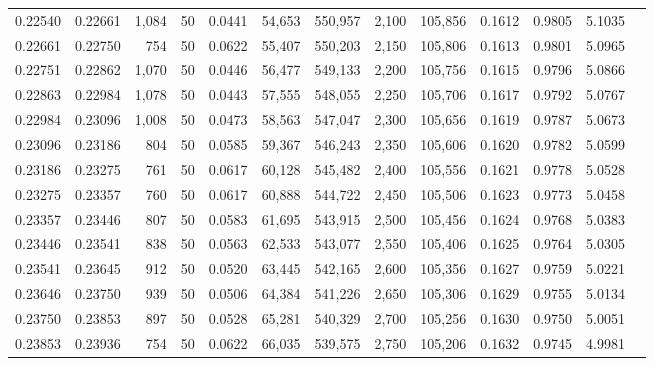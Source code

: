 \begin{tabular}{rrrrrrrrrrrrr}
0.22540 & 0.22661 & 1,084 &  50 &                                     0.0441 &  54,653 & 550,957 &   2,100 & 105,856 & 0.1612 & 0.9805 & 5.1035 \\
0.22661 & 0.22750 &   754 &  50 &                                     0.0622 &  55,407 & 550,203 &   2,150 & 105,806 & 0.1613 & 0.9801 & 5.0965 \\
0.22751 & 0.22862 & 1,070 &  50 &                                     0.0446 &  56,477 & 549,133 &   2,200 & 105,756 & 0.1615 & 0.9796 & 5.0866 \\
0.22863 & 0.22984 & 1,078 &  50 &                                     0.0443 &  57,555 & 548,055 &   2,250 & 105,706 & 0.1617 & 0.9792 & 5.0767 \\
0.22984 & 0.23096 & 1,008 &  50 &                                     0.0473 &  58,563 & 547,047 &   2,300 & 105,656 & 0.1619 & 0.9787 & 5.0673 \\
0.23096 & 0.23186 &   804 &  50 &                                     0.0585 &  59,367 & 546,243 &   2,350 & 105,606 & 0.1620 & 0.9782 & 5.0599 \\
0.23186 & 0.23275 &   761 &  50 &                                     0.0617 &  60,128 & 545,482 &   2,400 & 105,556 & 0.1621 & 0.9778 & 5.0528 \\
0.23275 & 0.23357 &   760 &  50 &                                     0.0617 &  60,888 & 544,722 &   2,450 & 105,506 & 0.1623 & 0.9773 & 5.0458 \\
0.23357 & 0.23446 &   807 &  50 &                                     0.0583 &  61,695 & 543,915 &   2,500 & 105,456 & 0.1624 & 0.9768 & 5.0383 \\
0.23446 & 0.23541 &   838 &  50 &                                     0.0563 &  62,533 & 543,077 &   2,550 & 105,406 & 0.1625 & 0.9764 & 5.0305 \\
0.23541 & 0.23645 &   912 &  50 &                                     0.0520 &  63,445 & 542,165 &   2,600 & 105,356 & 0.1627 & 0.9759 & 5.0221 \\
0.23646 & 0.23750 &   939 &  50 &                                     0.0506 &  64,384 & 541,226 &   2,650 & 105,306 & 0.1629 & 0.9755 & 5.0134 \\
0.23750 & 0.23853 &   897 &  50 &                                     0.0528 &  65,281 & 540,329 &   2,700 & 105,256 & 0.1630 & 0.9750 & 5.0051 \\
0.23853 & 0.23936 &   754 &  50 &                                     0.0622 &  66,035 & 539,575 &   2,750 & 105,206 & 0.1632 & 0.9745 & 4.9981 \\

\end{tabular}
